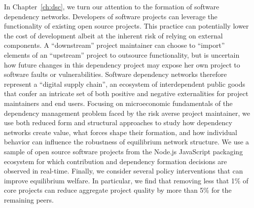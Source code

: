 In Chapter~\ref{ch:dsc}, we turn our attention to the formation of software
dependency networks.  Developers of software projects can leverage the
functionality of existing open source projects.  This practice can potentially
lower the cost of development albeit at the inherent risk of relying on external
components. A ``downstream'' project maintainer can choose to ``import''
elements of an ``upstream'' project to outsource functionality, but is uncertain
how future changes in this dependency project may expose her own project to
software faults or vulnerabilities. Software dependency networks therefore
represent a ``digital supply chain'', an ecosystem of interdependent public
goods that confer an intricate set of both positive and negative externalities
for project maintainers and end users.  Focusing on microeconomic fundamentals
of the dependency management problem faced by the risk averse project
maintainer, we use both reduced form and structural approaches to study how
dependency networks create value, what forces shape their formation, and how
individual behavior can influence the robustness of equilibrium network
structure.  We use a sample of open source software projects from the Node.js
JavaScript packaging ecosystem for which contribution and dependency formation
decisions are observed in real-time. Finally, we consider several policy
interventions that can improve equilibrium welfare.  In particular, we find that
removing less that 1\% of core projects can reduce aggregate project quality by
more than 5\% for the remaining peers.

